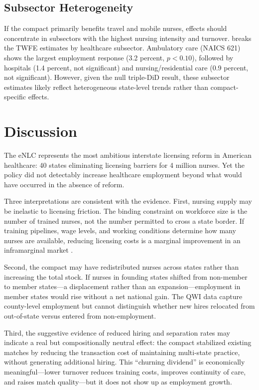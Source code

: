 \documentclass[12pt]{article}
\begin{document}
\subsection{Subsector Heterogeneity}



If the compact primarily benefits travel and mobile nurses, effects should concentrate in subsectors with the highest nursing intensity and turnover.  breaks the TWFE estimates by healthcare subsector. Ambulatory care (NAICS 621) shows the largest employment response (3.2 percent, $p < 0.10$), followed by hospitals (1.4 percent, not significant) and nursing/residential care (0.9 percent, not significant). However, given the null triple-DiD result, these subsector estimates likely reflect heterogeneous state-level trends rather than compact-specific effects.


\section{Discussion}

The eNLC represents the most ambitious interstate licensing reform in American healthcare: 40 states eliminating licensing barriers for 4 million nurses. Yet the policy did not detectably increase healthcare employment beyond what would have occurred in the absence of reform.

Three interpretations are consistent with the evidence. First, nursing supply may be inelastic to licensing friction. The binding constraint on workforce size is the number of trained nurses, not the number permitted to cross a state border. If training pipelines, wage levels, and working conditions determine how many nurses are available, reducing licensing costs is a marginal improvement in an inframarginal market \citep{buerhaus2017current, buchan2015solving}.

Second, the compact may have redistributed nurses across states rather than increasing the total stock. If nurses in founding states shifted from non-member to member states---a displacement rather than an expansion---employment in member states would rise without a net national gain. The QWI data capture county-level employment but cannot distinguish whether new hires relocated from out-of-state versus entered from non-employment.

Third, the suggestive evidence of reduced hiring and separation rates may indicate a real but compositionally neutral effect: the compact stabilized existing matches by reducing the transaction cost of maintaining multi-state practice, without generating additional hiring. This ``churning dividend'' is economically meaningful---lower turnover reduces training costs, improves continuity of care, and raises match quality---but it does not show up as employment growth.
\end{document}

